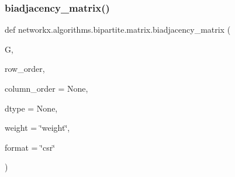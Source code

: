 \subsubsection{\texorpdfstring{biadjacency\+\_\+matrix()}{biadjacency\_matrix()}}
{\footnotesize\ttfamily def networkx.\+algorithms.\+bipartite.\+matrix.\+biadjacency\+\_\+matrix (\begin{DoxyParamCaption}\item[{}]{G,  }\item[{}]{row\+\_\+order,  }\item[{}]{column\+\_\+order = {\ttfamily None},  }\item[{}]{dtype = {\ttfamily None},  }\item[{}]{weight = {\ttfamily \char`\"{}weight\char`\"{}},  }\item[{}]{format = {\ttfamily \char`\"{}csr\char`\"{}} }\end{DoxyParamCaption})}


